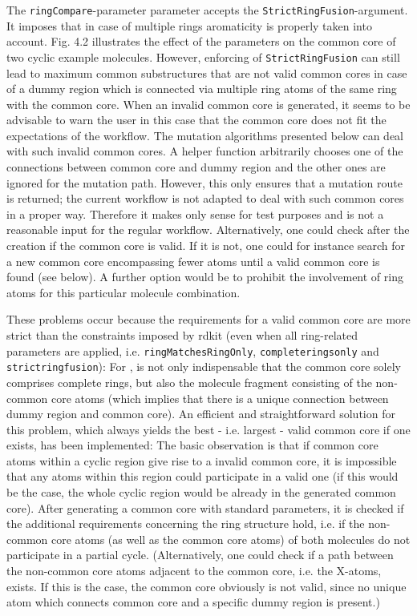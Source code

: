 The \texttt{ringCompare}-parameter parameter accepts the \texttt{StrictRingFusion}-argument.
It imposes that in case of multiple rings aromaticity is properly
taken into account. Fig. 4.2 illustrates the effect of the parameters
on the common core of two cyclic example molecules. However, enforcing
of \texttt{StrictRingFusion} can still lead to maximum common substructures
that are not valid {\trafo} common cores in case of a dummy region
which is connected via multiple ring atoms of the same ring with the common
core. 
When an invalid common core is generated, it seems to be advisable to warn the user in this case that the common core does not fit the expectations of the {\trafo} workflow. 
The mutation algorithms presented below can deal with such invalid common cores. A helper function arbitrarily chooses one of the connections between common core and dummy region and the other ones are ignored for the mutation path. However, this only ensures that a mutation route is returned; the current {\trafo} workflow is not adapted to deal with such common cores in a proper way. Therefore it makes only sense for test purposes and is not a reasonable input for the regular workflow.
Alternatively, one could check after the creation if the common core is valid. If
it is not, one could for instance search for a new common core encompassing fewer
atoms until a valid common core is found (see below). A further option would be to prohibit the involvement of ring atoms for this particular molecule combination.

These problems occur because the requirements for a valid {\trafo} common core are more strict than the constraints imposed by rdkit  (even when all ring-related parameters are applied, i.e. \texttt{ringMatchesRingOnly}, \texttt{completeringsonly} and \texttt{strictringfusion}): For {\trafo}, is not only indispensable that the common core solely comprises complete rings, but also the molecule fragment consisting of the non-common core atoms (which implies that there is a unique connection between dummy region and common core).
An efficient and straightforward solution for this problem, which always yields the best - i.e. largest - valid common core if one exists, has been implemented:
The basic observation is that if common core atoms within a cyclic region give rise to a invalid common core, it is impossible that any atoms within this region could participate in a valid one (if this would be the case, the whole cyclic region would be already in the generated common core).
After generating a common core with standard parameters, it is checked if the additional requirements concerning the ring structure hold, i.e. if the non-common core atoms (as well as the common core atoms) of both molecules do not participate in a partial cycle.
(Alternatively, one could check if a path between the non-common core atoms adjacent to the common core, i.e. the X-atoms, exists. If this is the case, the common core obviously is not valid, since no unique atom which connects common core and a specific dummy region is present.)





